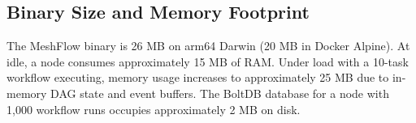 \subsection{Binary Size and Memory Footprint}

The MeshFlow binary is 26 MB on arm64 Darwin (20 MB in Docker Alpine). At idle, a node consumes approximately 15 MB of RAM. Under load with a 10-task workflow executing, memory usage increases to approximately 25 MB due to in-memory DAG state and event buffers. The BoltDB database for a node with 1,000 workflow runs occupies approximately 2 MB on disk.
